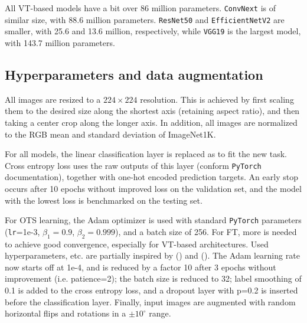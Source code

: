 
All VT-based models have a bit over 86 million parameters. \texttt{ConvNext} is of similar size, with 88.6 million parameters. \texttt{ResNet50} and \texttt{EfficientNetV2} are smaller, with 25.6 and 13.6 million, respectively, while \texttt{VGG19} is the largest model, with 143.7 million parameters.


\subsection{Hyperparameters and data augmentation}
All images are resized to a $224 \times 224$ resolution. This is achieved by first scaling them to the desired size along the shortest axis (retaining aspect ratio), and then taking a center crop along the longer axis. In addition, all images are normalized to the RGB mean and standard deviation of ImageNet1K.

For all models, the linear classification layer is replaced as to fit the new task. Cross entropy loss uses the raw outputs of this layer (conform \texttt{PyTorch} documentation), together with one-hot encoded prediction targets. An early stop occurs after 10 epochs without improved loss on the validation set, and the model with the lowest loss is benchmarked on the testing set.

For OTS learning, the Adam optimizer \citep{kingma2014adam} is used with standard \texttt{PyTorch} parameters (\texttt{lr}=1e-3, $\beta_1=0.9$, $\beta_2=0.999$), and a batch size of 256. For FT, more is needed to achieve good convergence, especially for VT-based architectures. Used hyperparameters, etc. are partially inspired by \citeauthor{matsoukas2021time} (\citeyear{matsoukas2021time}) and \citeauthor{zhou2021convnets} (\citeyear{zhou2021convnets}). The Adam learning rate now starts off at 1e-4, and is reduced by a factor 10 after 3 epochs without improvement (i.e. patience=2); the batch size is reduced to 32; label smoothing of 0.1 is added to the cross entropy loss, and a dropout layer with p=0.2 is inserted before the classification layer. Finally, input images are augmented with random horizontal flips and rotations in a $\pm 10 ^\circ$ range.

